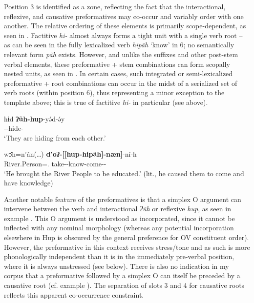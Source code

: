 \documentclass[output=paper]{langscibook}
\begin{document}
Position 3 is identified as a zone, reflecting the fact that the interactional, reflexive, and causative preformatives may co-occur and variably order with one another. The relative ordering of these elements is primarily scope-dependent, as seen in . Factitive \textit{hi-} almost always forms a tight unit with a single verb root – as can be seen in the fully lexicalized verb \textit{hipãh} `know' in 6; no semantically relevant form \textit{pãh} exists. However, and unlike the suffixes and other post-stem verbal elements, these preformative + stem combinations can form scopally nested units, as seen in  . In certain cases, such integrated or semi-lexicalized preformative + root combinations can occur in the midst of a serialized set of verb roots (within position 6), thus representing a minor exception to the template above; this is true of factitive \textit{hi-} in particular (see  above).

\ea\label{ex:hup:key:5} 
\gll hɨd \textbf{ʔũh-hup}-yǝ́d-ǝ́y \\ 
\Third\Pl{} \Intrc-\Refl{}-hide-\Dynm{} \\ 
\glt `They are hiding from each other.' 
\z 

\ea\label{ex:hup:key:6} 
\gll wɔ̌h=n'ǎn(…) \textbf{d'oʔ-[[hup-hipãh]-næn]}-ní-h  \\ 
River.Person=\Pl.\Obj{} take-\Refl{}-know-come-\Infr{}-\Decl{}\\ 
\glt `He brought the River People to be educated.' (lit., he caused them to come and have   knowledge)
\z 

Another notable feature of the preformatives is that a simplex O argument can intervene between the verb and interactional \textit{ʔ\~uh} or reflexive \textit{hup}, as seen in example . This O argument is understood as incorporated, since it cannot be inflected with any nominal morphology (whereas any potential incorporation elsewhere in Hup is obscured by the general preference for OV constituent order). However, the preformative in this context receives stress/tone and as such is more phonologically independent than it is in the immediately pre-verbal position, where it is always unstressed (see  below). There is also no indication in my corpus that a preformative followed by a simplex O can itself be preceded by a causative root (cf. example ). The separation of slots 3 and 4 for causative roots reflects this apparent co-occurrence constraint.
\end{document}
